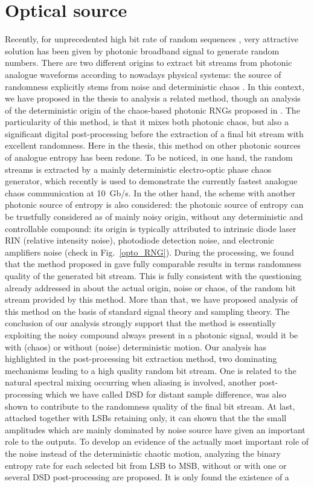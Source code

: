 \section{Optical source}
Recently, for unprecedented high bit rate of random sequences , very attractive solution has been given by photonic broadband signal to generate random numbers. There are two different origins to extract bit streams from photonic analogue waveforms according to nowadays physical systems: the source of randomness explicitly stems from noise \cite{li:OL11,wetzel:ox12} and deterministic chaos \cite{fast,ultrafast2009}. In this context, we have proposed in the thesis to analysis a related method, though an analysis of the deterministic origin of the chaos-based photonic RNGs proposed in \cite{ultrafast2009, ultrafast2010}. The particularity of this method, is that it mixes both photonic chaos, but also a significant digital post-processing before the extraction of a final bit stream with excellent randomness. Here in the thesis, this method on other photonic sources of analogue entropy has been redone. To be noticed, in one hand, the random streams is extracted by a mainly deterministic electro-optic phase chaos 
generator, which recently is used to demonstrate the currently fastest analogue chaos communication at 10~Gb/s. In the other hand, the scheme with another photonic source of entropy is also considered:  the photonic source of entropy can be trustfully considered as of mainly noisy origin, without any deterministic and controllable compound: its origin is typically attributed to intrinsic diode laser RIN (relative intensity noise), photodiode detection noise, and electronic amplifiers noise (check in Fig.~\ref{opto_RNG}). During the processing, we found that the method proposed in \cite{ultrafast2009,ultrafast2010} gave fully comparable results in terms randomness quality of the generated bit stream. This is fully consistent with the questioning already addressed in \cite{williams:OE10,hirano:OE10} about the actual origin, noise or chaos, of the random bit stream provided by this method. More than that, we have proposed analysis of this method on the basis of standard signal theory and sampling theory. The 
conclusion of our analysis strongly support that
the method is essentially exploiting the noisy compound always present in a photonic signal, would it be with (chaos) or without (noise) deterministic motion. Our analysis has highlighted in the post-processing bit extraction method, two dominating mechanisms leading to a high quality random bit stream. One is related to the natural spectral mixing occurring when aliasing is involved, another post-processing which we have called DSD for distant sample difference, was also shown to contribute to the randomness quality of the final bit stream. At last, attached together with LSBs retaining only, it can shown that the the small amplitudes which are mainly dominated by noise source have given an important role to the outputs. To develop an evidence of the actually most important role of the noise instead of the deterministic chaotic motion, analyzing the binary entropy rate for each selected bit from LSB to MSB, without or with one or several DSD post-processing are proposed. It is only found the existence of a 
